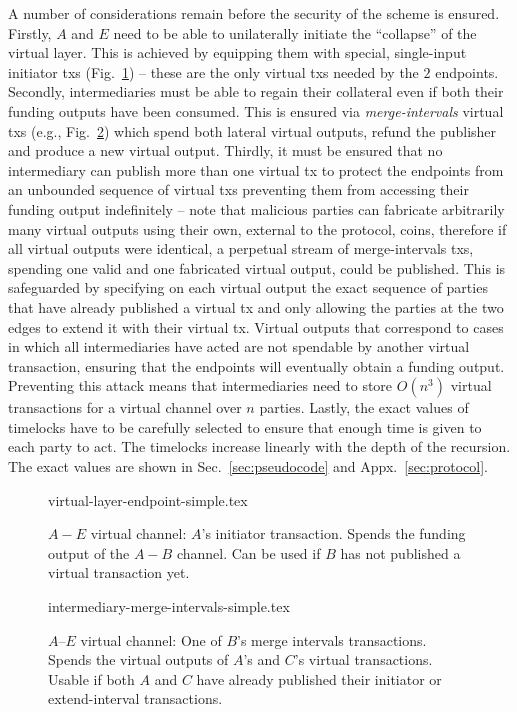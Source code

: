   A number of considerations remain before the security of the scheme is
  ensured. Firstly, $A$ and $E$ need to be able to unilaterally initiate the
  ``collapse'' of the virtual layer. This is achieved by equipping them with
  special, single-input initiator txs
  (Fig.~\ref{figure:virtual-layer-endpoint-simple}) -- these are the only virtual
  txs needed by the $2$ endpoints. Secondly, intermediaries must be able to
  regain their collateral even if both their funding outputs have been consumed.
  This is ensured via \emph{merge-intervals} virtual txs (e.g.,
  Fig.~\ref{figure:virtual-layer-merge-intervals-simple}) which spend both
  lateral virtual outputs, refund the publisher and produce a new virtual
  output. Thirdly, it must be ensured that no intermediary can publish more than
  one virtual tx to protect the endpoints from an unbounded sequence of virtual
  txs preventing them from accessing their funding output indefinitely -- note
  that malicious parties can fabricate arbitrarily many virtual outputs using
  their own, external to the protocol, coins, therefore if all virtual outputs
  were identical, a perpetual stream of merge-intervals txs, spending one valid
  and one fabricated virtual output, could be published. This is safeguarded by
  specifying on each virtual output the exact sequence of parties that have
  already published a virtual tx and only allowing the parties at the two edges
  to extend it with their virtual tx. Virtual outputs that correspond to cases
  in which all intermediaries have acted are not spendable by another virtual
  transaction, ensuring that the endpoints will eventually obtain a funding
  output. Preventing this attack means that intermediaries need to store
  $O(n^3)$ virtual transactions for a virtual channel over $n$ parties. Lastly,
  the exact values of timelocks have to be carefully selected to ensure that
  enough time is given to each party to act. The timelocks increase linearly
  with the depth of the recursion. The exact values are shown in
  Sec.~\ref{sec:pseudocode} and Appx.~\ref{sec:protocol}.

  \begin{figure}
    {virtual-layer-endpoint-simple.tex}
    \caption{$A-E$ virtual channel: $A$'s initiator transaction. Spends the
    funding output of the $A-B$ channel. Can be used if $B$ has not published
    a virtual transaction yet.}
    \label{figure:virtual-layer-endpoint-simple}
  \end{figure}

  \begin{figure}
    {intermediary-merge-intervals-simple.tex}
    \caption{$A$--$E$ virtual channel: One of $B$'s merge intervals
    transactions. Spends the virtual outputs of $A$'s and $C$'s virtual
    transactions. Usable if both $A$ and $C$ have already published their
    initiator or extend-interval transactions.}
    \label{figure:virtual-layer-merge-intervals-simple}
  \end{figure}

